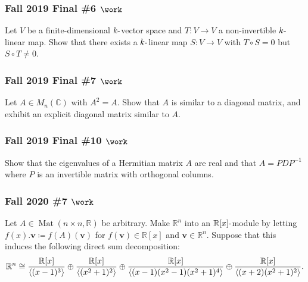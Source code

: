 \hypertarget{fall-2019-final-6-work}{%
\subsubsection{\texorpdfstring{Fall 2019 Final \#6
\(\work\)}{Fall 2019 Final \#6 \textbackslash work}}\label{fall-2019-final-6-work}}

Let \(V\) be a finite-dimensional \(k{\hbox{-}}\)vector space and
\(T:V\to V\) a non-invertible \(k{\hbox{-}}\)linear map. Show that there
exists a \(k{\hbox{-}}\)linear map \(S:V\to V\) with \(T\circ S = 0\)
but \(S\circ T\neq 0\).

\hypertarget{fall-2019-final-7-work}{%
\subsubsection{\texorpdfstring{Fall 2019 Final \#7
\(\work\)}{Fall 2019 Final \#7 \textbackslash work}}\label{fall-2019-final-7-work}}

Let \(A\in M_n({\mathbb{C}})\) with \(A^2 = A\). Show that \(A\) is
similar to a diagonal matrix, and exhibit an explicit diagonal matrix
similar to \(A\).

\hypertarget{fall-2019-final-10-work}{%
\subsubsection{\texorpdfstring{Fall 2019 Final \#10
\(\work\)}{Fall 2019 Final \#10 \textbackslash work}}\label{fall-2019-final-10-work}}

Show that the eigenvalues of a Hermitian matrix \(A\) are real and that
\(A = PDP^{-1}\) where \(P\) is an invertible matrix with orthogonal
columns.

\hypertarget{fall-2020-7-work}{%
\subsubsection{\texorpdfstring{Fall 2020 \#7
\(\work\)}{Fall 2020 \#7 \textbackslash work}}\label{fall-2020-7-work}}

Let \(A \in \operatorname{Mat}(n\times n, {\mathbb{R}})\) be arbitrary.
Make \({\mathbb{R}}^n\) into an \({\mathbb{R}}[x]{\hbox{-}}\)module by
letting \(f(x).\mathbf{v} \coloneqq f(A)(\mathbf{v})\) for
\(f(\mathbf{v})\in {\mathbb{R}}[x]\) and
\(\mathbf{v} \in {\mathbb{R}}^n\). Suppose that this induces the
following direct sum decomposition:
\begin{align*}
{\mathbb{R}}^n \cong
{ {\mathbb{R}}[x] \over \left\langle{ (x-1)^3 }\right\rangle }
\oplus
{ {\mathbb{R}}[x] \over \left\langle{ (x^2+1)^2 }\right\rangle }
\oplus
{ {\mathbb{R}}[x] \over \left\langle{ (x-1)(x^2-1)(x^2+1)^4 }\right\rangle }
\oplus
{ {\mathbb{R}}[x] \over \left\langle{ (x+2)(x^2+1)^2 }\right\rangle }
.\end{align*}

